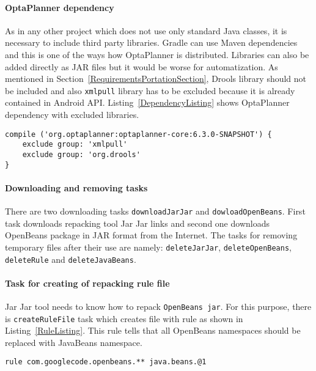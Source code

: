 \paragraph{OptaPlanner dependency}
As in any other project which does not use only standard Java classes, it is necessary to include third party libraries.
Gradle can use Maven dependencies and this is one of the ways how OptaPlanner is distributed. Libraries can also be
added directly as JAR files but it would be worse for automatization. As mentioned in
Section~\ref{RequirementsPortationSection}, Drools library should not be included and also \texttt{xmlpull} library has
to be excluded because it is already contained in Android API. Listing~\ref{DependencyListing} shows OptaPlanner
dependency with excluded libraries.
\\
\begin{lstlisting}[captionpos={b},caption={OptaPlanner Maven dependency in Gradle build script.},frame={lines},
label={DependencyListing},basicstyle=\footnotesize]
compile ('org.optaplanner:optaplanner-core:6.3.0-SNAPSHOT') {
    exclude group: 'xmlpull'
    exclude group: 'org.drools'
}
\end{lstlisting}

\paragraph{Downloading and removing tasks}
There are two downloading tasks \texttt{downloadJarJar} and \texttt{dowloadOpenBeans}. First task downloads repacking
tool Jar Jar links and second one downloads OpenBeans package in JAR format from the Internet. The tasks for removing
temporary files after their use are namely: \texttt{deleteJarJar}, \texttt{deleteOpenBeans}, \texttt{deleteRule} and
\texttt{deleteJavaBeans}.

\paragraph{Task for creating of repacking rule file}
Jar Jar tool needs to know how to repack \texttt{OpenBeans jar}. For this purpose, there is \texttt{createRuleFile} task
which creates file with rule as shown in Listing~\ref{RuleListing}. This rule tells that all OpenBeans namespaces should
be replaced with JavaBeans namespace.
\\
\begin{lstlisting}[captionpos={b},caption={Jar Jar Links rule for repacking OpenBeans to Java core namespace.},
frame={lines},label={RuleListing},basicstyle=\footnotesize]
rule com.googlecode.openbeans.** java.beans.@1
\end{lstlisting}

